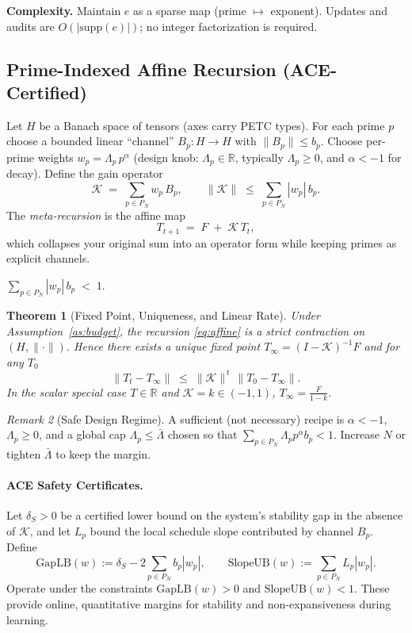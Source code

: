 \documentclass[11pt]{article}
\theoremstyle{plain}
\newtheorem{theorem}{Theorem}
\theoremstyle{definition}
\theoremstyle{remark}
\newtheorem{remark}[theorem]{Remark}
\begin{document}
\noindent\textbf{Complexity.}
Maintain $e$ as a sparse map (prime $\mapsto$ exponent). Updates and audits are $O(|\mathrm{supp}(e)|)$; no integer factorization is required.

\subsection{Prime-Indexed Affine Recursion (ACE-Certified)}
Let $H$ be a Banach space of tensors (axes carry PETC types).
For each prime $p$ choose a bounded linear ``channel'' $B_p:H\!\to\!H$ with $\|B_p\|\le b_p$.
Choose per-prime weights $w_p=\Lambda_p\,p^{\alpha}$ (design knob: $\Lambda_p\in\mathbb{R}$, typically $\Lambda_p\ge 0$, and $\alpha< -1$ for decay).
Define the gain operator
\[
  \mathcal{K}\;=\;\sum_{p\in P_N} w_p\,B_p,
\qquad
  \|\mathcal{K}\| \;\le\; \sum_{p\in P_N} |w_p|\,b_p.
\]
The \emph{meta-recursion} is the affine map
\begin{equation}
  \label{eq:affine}
  T_{t+1} \;=\; F \;+\; \mathcal{K}\,T_t,
\end{equation}
which collapses your original sum into an operator form while keeping primes as explicit channels.

\begin{assumption}\label{as:budget}
$\displaystyle \sum_{p\in P_N} |w_p|\,b_p \;<\;1.$
\end{assumption}

\begin{theorem}[Fixed Point, Uniqueness, and Linear Rate]
Under Assumption~\ref{as:budget}, the recursion \eqref{eq:affine} is a strict contraction on $(H,\|\cdot\|)$.
Hence there exists a unique fixed point $T_\infty = (I-\mathcal{K})^{-1}F$ and for any $T_0$
\[
  \|T_{t}-T_\infty\| \;\le\; \|\mathcal{K}\|^{\,t}\,\|T_0-T_\infty\|.
\]
In the scalar special case $T\in\mathbb{R}$ and $\mathcal{K}=k\in(-1,1)$, $T_\infty=\frac{F}{1-k}$.
\end{theorem}

\begin{remark}[Safe Design Regime]
A sufficient (not necessary) recipe is $\alpha< -1$, $\Lambda_p\ge 0$, and a global cap $\Lambda_p\le \bar\Lambda$ chosen so that
$\sum_{p\in P_N} \Lambda_p p^{\alpha} b_p < 1$. Increase $N$ or tighten $\bar\Lambda$ to keep the margin.
\end{remark}

\paragraph{ACE Safety Certificates.}
Let $\delta_S>0$ be a certified lower bound on the system's stability gap in the absence of $\mathcal{K}$,
and let $L_p$ bound the local schedule slope contributed by channel $B_p$.
Define
\[
  \mathrm{GapLB}(w) := \delta_S - 2\sum_{p\in P_N} b_p |w_p|, 
  \qquad
  \mathrm{SlopeUB}(w) := \sum_{p\in P_N} L_p |w_p|.
\]
Operate under the constraints $\mathrm{GapLB}(w)>0$ and $\mathrm{SlopeUB}(w)<1$.
These provide online, quantitative margins for stability and non-expansiveness during learning.
\end{document}
